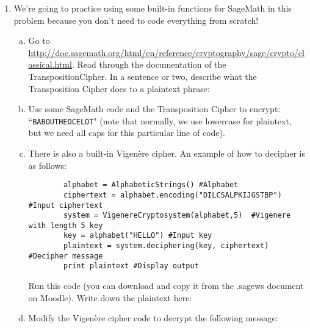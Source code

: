 \documentclass[12pt]{amsart}
\theoremstyle{plain}
\theoremstyle{definition}
\begin{document}
\begin{enumerate}[1.]
\begin{enumerate}[a.]
		\begin{framed}
		\vspace{1.3in}
		\end{framed}
	\end{enumerate}
\item We're going to practice using some built-in functions for SageMath in this problem because you don't need to code everything from scratch!  
		\begin{enumerate}[a.]
		\item Go to \url{http://doc.sagemath.org/html/en/reference/cryptography/sage/crypto/classical.html}.  Read through the documentation of the TranspositionCipher.  In a sentence or two, describe what the Transposition Cipher does to a plaintext phrase:
		\begin{framed}
		\vspace{.7in}
		\end{framed}
		\item Use some SageMath code and the Transposition Cipher to encrypt: ``\texttt{BABOUTHEOCELOT}" (note that normally, we use lowercase for plaintext, but we need all caps for this particular line of code).
		\begin{framed}
		\vspace{1in}
		\end{framed}
		\item There is also a built-in Vigen\`{e}re cipher.  An example of how to decipher is as follows:\\ %
		
		\begin{verbatim}
		alphabet = AlphabeticStrings() #Alphabet
		ciphertext = alphabet.encoding("DILCSALPKIJGSTBP")  #Input ciphertext
		system = VigenereCryptosystem(alphabet,5)  #Vigenere with length 5 key
		key = alphabet("HELLO") #Input key
		plaintext = system.deciphering(key, ciphertext)  #Decipher message
		print plaintext #Display output
		\end{verbatim}
		
		\vspace{.1in}		
		Run this code (you can download and copy it from the .sagews document on Moodle).  Write down the plaintext here:
		\begin{framed}
		\vspace{.7in}
		\end{framed}
		\item Modify the Vigen\`{e}re cipher code to decrypt the following message: \\
		

\end{enumerate}
\end{enumerate}
\end{document}

